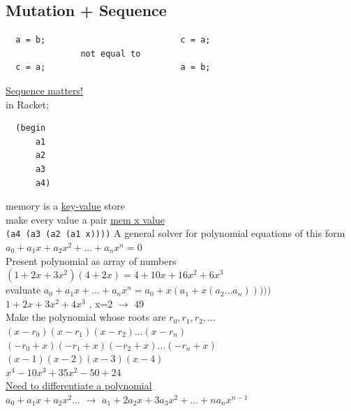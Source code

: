 \documentclass{article}
\begin{document}
\begin{flushleft}
\subsection*{Mutation + Sequence}
\begin{flushleft}
 \begin{verbatim}
  a = b;                           c = a;
               not equal to        
  c = a;                           a = b;
 \end{verbatim}
 \underline{Sequence matters!}\\
 \bigskip
 in Racket;\\
 \begin{verbatim}
  (begin
      a1
      a2
      a3
      a4)
 \end{verbatim}
 memory is a \underline{key-value} store\\
 make every value a pair \underline{mem x value}\\
 \verb|(a4 (a3 (a2 (a1 x))))|
 \bigskip
 A general solver for polynomial equations of this form\\
 $a_0 + a_1x + a_2x^2 + ... + a_nx^n = 0$\\
 Present polynomial as array of numbers\\
 $(1 + 2x + 3x^2) (4 + 2x) = 4 + 10x + 16x^2 + 6x^3$\\
 evaluate $a_0 + a_1x + ... + a_nx^n = a_0 + x(a_1 + x(a_2 ... a_n)))))$\\
 $1 + 2x + 3x^2 + 4x^3$  , x=2 $\rightarrow$ 49\\
 Make the polynomial whose roots are $r_0, r_1, r_2, ...$\\
 $(x - r_0) (x - r_1) (x - r_2) ... (x - r_n)$\\
 $(-r_0 + x) (-r_1 + x) (-r_2 + x) ... (-r_n + x)$\\
 $(x - 1) (x - 2) (x - 3) (x - 4)$\\
 $x^4 - 10x^3 + 35x^2 - 50 + 24$\\
 \underline{Need to differentiate a polynomial}\\
 $a_0 + a_1x + a_2x^2 ... $ $\rightarrow$ $a_1 + 2a_2x + 3a_3x^2 + ... + na_nx^{n-1}$
\end{flushleft}
\end{flushleft}
\end{document}
